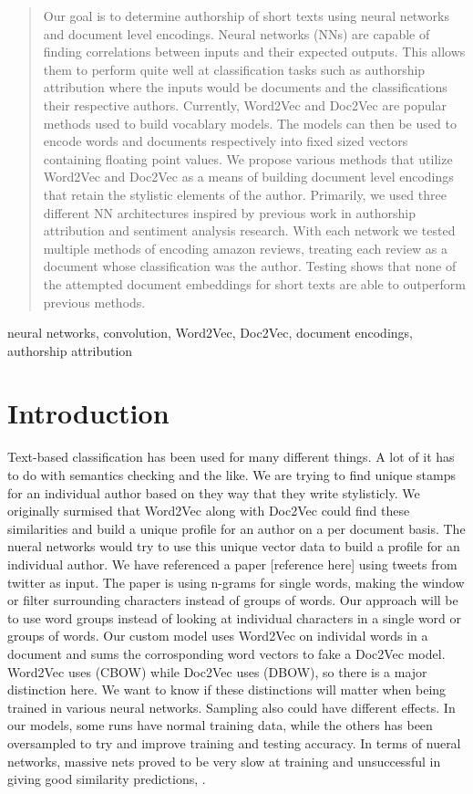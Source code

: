 \documentclass[conference]{IEEEtran}
\begin{document}
\begin{abstract}
Our goal is to determine authorship of short texts using neural networks and document level encodings. Neural networks (NNs) are capable of finding correlations between inputs and their expected outputs. This allows them to perform quite well at classification tasks such as authorship attribution where the inputs would be documents and the classifications their respective authors. Currently, Word2Vec and Doc2Vec are popular methods used to build vocablary models. The models can then be used to encode words and documents respectively into fixed sized vectors containing floating point values. We propose various methods that utilize Word2Vec and Doc2Vec as a means of building document level encodings that retain the stylistic elements of the author. Primarily, we used three different NN architectures inspired by previous work in authorship attribution and sentiment analysis research. With each network we tested multiple methods of encoding amazon reviews, treating each review as a document whose classification was the author. Testing shows that none of the attempted document embeddings for short texts are able to outperform previous methods.
\end{abstract}



\begin{IEEEkeywords}
neural networks, convolution, Word2Vec, Doc2Vec, document encodings, authorship attribution
\end{IEEEkeywords}

\section{Introduction}

    Text-based classification has been used for many different things. A lot of it has to do with semantics checking and the like. We are trying to find unique stamps for an individual author based on they way that they write stylisticly. We originally surmised that Word2Vec along with Doc2Vec could find these similarities and build a unique profile for an author on a per document basis. The nueral networks would try to use this unique vector data to build a profile for an individual author. We have referenced a paper [reference here] using tweets from twitter as input. The paper is using n-grams for single words, making the window or filter surrounding characters instead of groups of words. Our approach will be to use word groups instead of looking at individual characters in a single word or groups of words. Our custom model uses Word2Vec on individal words in a document and sums the corrosponding word vectors to fake a Doc2Vec model. Word2Vec uses (CBOW) while Doc2Vec uses (DBOW), so there is a major distinction here. We want to know if these distinctions will matter when being trained in various neural networks. Sampling also could have different effects. In our models, some runs have normal training data, while the others has been oversampled to try and improve training and testing accuracy.
    In terms of nueral networks, massive nets proved to be very slow at training and unsuccessful in giving good similarity predictions, \cite{b1}.
\end{document}
